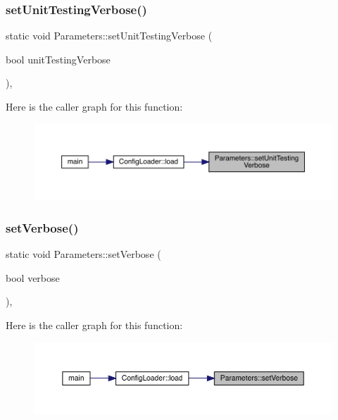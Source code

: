\subsubsection{\texorpdfstring{setUnitTestingVerbose()}{setUnitTestingVerbose()}}
{\footnotesize\ttfamily static void Parameters\+::set\+Unit\+Testing\+Verbose (\begin{DoxyParamCaption}\item[{bool}]{unit\+Testing\+Verbose }\end{DoxyParamCaption})\hspace{0.3cm}{\ttfamily [inline]}, {\ttfamily [static]}}

Here is the caller graph for this function\+:\nopagebreak
\begin{figure}[H]
\begin{center}
\leavevmode
\includegraphics[width=350pt]{class_parameters_a2cf1ae12581e8f80dd88ce6c60f37c5f_icgraph}
\end{center}
\end{figure}
\mbox{\label{class_parameters_aa0ac9d09db506844758e0a5d23dedeb4}} 
\subsubsection{\texorpdfstring{setVerbose()}{setVerbose()}}
{\footnotesize\ttfamily static void Parameters\+::set\+Verbose (\begin{DoxyParamCaption}\item[{bool}]{verbose }\end{DoxyParamCaption})\hspace{0.3cm}{\ttfamily [inline]}, {\ttfamily [static]}}

Here is the caller graph for this function\+:\nopagebreak
\begin{figure}[H]
\begin{center}
\leavevmode
\includegraphics[width=350pt]{class_parameters_aa0ac9d09db506844758e0a5d23dedeb4_icgraph}
\end{center}
\end{figure}


